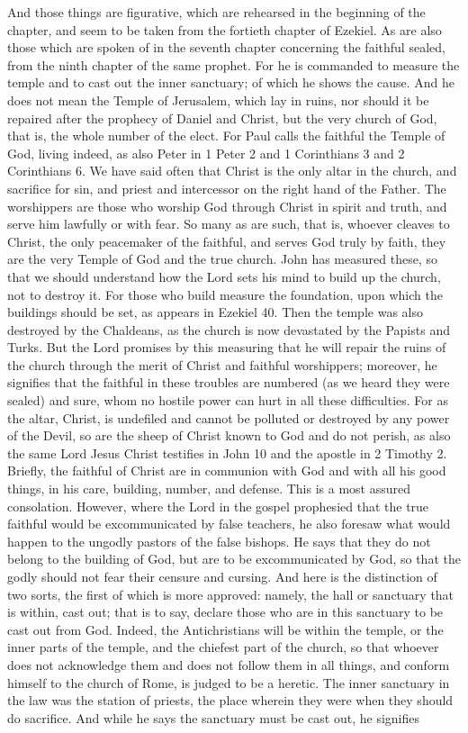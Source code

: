 And those things are figurative, which are rehearsed in the beginning of the chapter, and seem to be taken from the fortieth chapter of Ezekiel. As are also those which are spoken of in the seventh chapter concerning the faithful sealed, from the ninth chapter of the same prophet. For he is commanded to measure the temple and to cast out the inner sanctuary; of which he shows the cause. And he does not mean the Temple of Jerusalem, which lay in ruins, nor should it be repaired after the prophecy of Daniel and Christ, but the very church of God, that is, the whole number of the elect. For Paul calls the faithful the Temple of God, living indeed, as also Peter in 1 Peter 2 and 1 Corinthians 3 and 2 Corinthians 6. We have said often that Christ is the only altar in the church, and sacrifice for sin, and priest and intercessor on the right hand of the Father. The worshippers are those who worship God through Christ in spirit and truth, and serve him lawfully or with fear. So many as are such, that is, whoever cleaves to Christ, the only peacemaker of the faithful, and serves God truly by faith, they are the very Temple of God and the true church. John has measured these, so that we should understand how the Lord sets his mind to build up the church, not to destroy it. For those who build measure the foundation, upon which the buildings should be set, as appears in Ezekiel 40. Then the temple was also destroyed by the Chaldeans, as the church is now devastated by the Papists and Turks. But the Lord promises by this measuring that he will repair the ruins of the church through the merit of Christ and faithful worshippers; moreover, he signifies that the faithful in these troubles are numbered (as we heard they were sealed) and sure, whom no hostile power can hurt in all these difficulties. For as the altar, Christ, is undefiled and cannot be polluted or destroyed by any power of the Devil, so are the sheep of Christ known to God and do not perish, as also the same Lord Jesus Christ testifies in John 10 and the apostle in 2 Timothy 2. Briefly, the faithful of Christ are in communion with God and with all his good things, in his care, building, number, and defense. This is a most assured consolation. However, where the Lord in the gospel prophesied that the true faithful would be excommunicated by false teachers, he also foresaw what would happen to the ungodly pastors of the false bishops. He says that they do not belong to the building of God, but are to be excommunicated by God, so that the godly should not fear their censure and cursing. And here is the distinction of two sorts, the first of which is more approved: namely, the hall or sanctuary that is within, cast out; that is to say, declare those who are in this sanctuary to be cast out from God. Indeed, the Antichristians will be within the temple, or the inner parts of the temple, and the chiefest part of the church, so that whoever does not acknowledge them and does not follow them in all things, and conform himself to the church of Rome, is judged to be a heretic. The inner sanctuary in the law was the station of priests, the place wherein they were when they should do sacrifice. And while he says the sanctuary must be cast out, he signifies 
